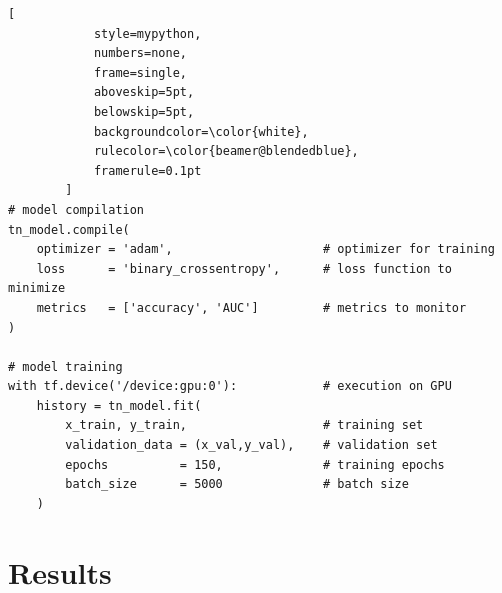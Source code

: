 \documentclass[xcolor=table,8pt]{beamer}
\begin{document}
\begin{frame}[t, fragile]
        \begin{lstlisting}[
            style=mypython,
            numbers=none,
            frame=single,
            aboveskip=5pt,
            belowskip=5pt,
            backgroundcolor=\color{white},
            rulecolor=\color{beamer@blendedblue},
            framerule=0.1pt
        ]
# model compilation
tn_model.compile(
    optimizer = 'adam',                     # optimizer for training
    loss      = 'binary_crossentropy',      # loss function to minimize
    metrics   = ['accuracy', 'AUC']         # metrics to monitor
)

# model training
with tf.device('/device:gpu:0'):            # execution on GPU
    history = tn_model.fit(                                         
        x_train, y_train,                   # training set
        validation_data = (x_val,y_val),    # validation set
        epochs          = 150,              # training epochs
        batch_size      = 5000              # batch size
    )
        \end{lstlisting}
    \end{frame}








    \section{Results}
\end{document}
